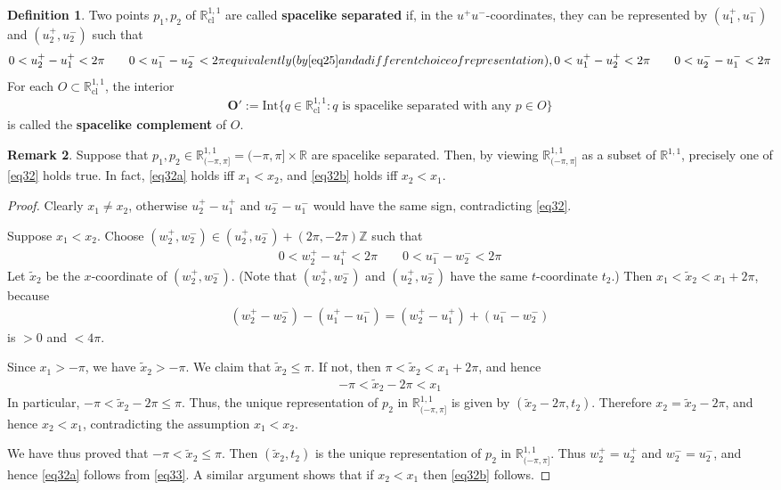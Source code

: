 \documentclass[11pt,b5paper,notitlepage]{article}
\theoremstyle{definition}
\newtheorem{df}{Definition}[section]
\newtheorem{rem}[df]{Remark}
\theoremstyle{plain}
\newcommand{\wtd}{\widetilde}
\newcommand{\Zbb}{\mathbb Z}
\newcommand{\Rbb}{\mathbb R}
\newcommand{\Int}{\mathrm{Int}}
\newcommand{\Roo}{\mathbb R^{1,1}}
\newcommand{\Rcl}{\mathbb R^{1,1}_{\mathrm{cl}}}
\numberwithin{equation}{section}
\begin{document}
\begin{df}
Two points $p_1,p_2$ of $\Rcl$ are called \textbf{spacelike separated} if, in the $u^+u^-$-coordinates, they can be represented by $(u^+_1,u^-_1)$ and $(u^+_2,u^-_2)$ such that
\begin{subequations}\label{eq32}
\begin{align}\label{eq32a}
0<u^+_2-u^+_1<2\pi\qquad 0<u^-_1-u^-_2<2\pi
\end{align}
equivalently (by \eqref{eq25} and a different choice of representation),
\begin{align}\label{eq32b}
0<u^+_1-u^+_2<2\pi\qquad 0<u^-_2-u^-_1<2\pi
\end{align}
\end{subequations}
For each $O\subset\Rcl$, the interior
\begin{align*}
\pmb{O'}:=\Int\{q\in\Rcl:q\text{ is spacelike separated with any }p\in O\}
\end{align*}
is called the \textbf{spacelike complement} of $O$.
\end{df}

\begin{rem}\label{lb76}
Suppose that $p_1,p_2\in\Roo_{(-\pi,\pi]}=(-\pi,\pi]\times\Rbb$ are spacelike separated. Then, by viewing $\Roo_{(-\pi,\pi]}$ as a subset of $\Roo$, precisely one of \eqref{eq32} holds true. In fact, \eqref{eq32a} holds iff $x_1<x_2$, and \eqref{eq32b} holds iff $x_2<x_1$.
\end{rem}


\begin{proof}
Clearly $x_1\neq x_2$, otherwise $u_2^+-u_1^+$ and $u_2^--u_1^-$ would have the same sign, contradicting \eqref{eq32}. 

Suppose $x_1<x_2$. Choose $(w_2^+,w_2^-)\in (u_2^+,u_2^-)+(2\pi,-2\pi)\Zbb$ such that 
\begin{align}\label{eq33}
0<w^+_2-u^+_1<2\pi\qquad 0<u^-_1-w^-_2<2\pi
\end{align}
Let $\wtd x_2$ be the $x$-coordinate of $(w_2^+,w_2^-)$. (Note that $(w_2^+,w_2^-)$ and $(u_2^+,u_2^-)$ have the same $t$-coordinate $t_2$.) Then $x_1<\wtd x_2<x_1+2\pi$, because
\begin{align*}
(w_2^+-w_2^-)-(u_1^+-u_1^-)=(w^+_2-u^+_1)+(u^-_1-w^-_2)
\end{align*}
is $>0$ and $<4\pi$.

Since $x_1>-\pi$, we have $\wtd x_2>-\pi$. We claim that $\wtd x_2\leq\pi$. If not, then $\pi<\wtd x_2<x_1+2\pi$, and hence
\begin{align*}
-\pi<\wtd x_2-2\pi<x_1
\end{align*}
In particular, $-\pi<\wtd x_2-2\pi\leq\pi$. Thus, the unique representation of $p_2$ in $\Roo_{(-\pi,\pi]}$ is given by $(\wtd x_2-2\pi,t_2)$. Therefore $x_2=\wtd x_2-2\pi$, and hence $x_2<x_1$, contradicting the assumption $x_1<x_2$.

We have thus proved that $-\pi<\wtd x_2\leq\pi$. Then $(\wtd x_2,t_2)$ is the unique representation of $p_2$ in $\Roo_{(-\pi,\pi]}$. Thus $w_2^+=u_2^+$ and $w_2^-=u_2^-$, and hence \eqref{eq32a} follows from \eqref{eq33}. A similar argument shows that if $x_2<x_1$ then \eqref{eq32b} follows.
\end{proof}
\end{document}
